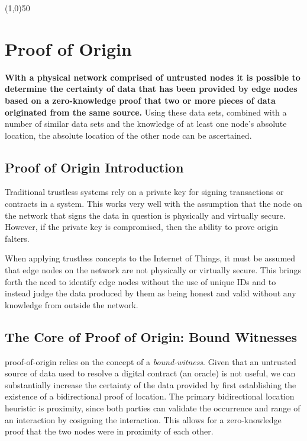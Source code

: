 \documentclass{article}
\begin{document}
\begin{center}
\line(1,0){50}
\end{center}

\section{Proof of Origin}
\textbf{With a physical network comprised of untrusted nodes it is possible to determine the \gls{certainty} of data that has been provided by edge nodes based on a zero-knowledge proof that two or more pieces of data originated from the same source.} Using these data sets, combined with a number of similar data sets and the knowledge of at least one node’s absolute location, the absolute location of the other node can be ascertained.

\subsection{Proof of Origin Introduction}

Traditional \gls{trustless} systems rely on a private key for signing transactions or contracts in a system. This works very well with the assumption that the node on the network that signs the data in question is physically and virtually secure. However, if the private key is compromised, then the ability to prove origin falters.

When applying trustless concepts to the Internet of Things, it must be assumed that edge nodes on the network are not physically or virtually secure. This brings forth the need to identify edge nodes without the use of unique IDs and to instead judge the data produced by them as being honest and valid without any knowledge from outside the network.

\subsection{The Core of Proof of Origin: Bound Witnesses}

\Gls{proof-of-origin} relies on the concept of a \textit{\Gls{bound-witness}}. Given that an untrusted source of data used to resolve a digital contract (an \gls{oracle}) is not useful, we can substantially increase the \gls{certainty} of the data provided by first establishing the existence of a bidirectional proof of location. The primary bidirectional location \gls{heuristic} is proximity, since both parties can validate the occurrence and range of an interaction by cosigning the interaction. This allows for a zero-knowledge proof that the two nodes were in proximity of each other.
\end{document}
